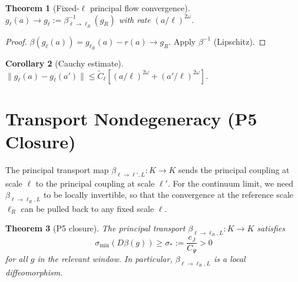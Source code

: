 \documentclass[12pt]{article}
\theoremstyle{plain}
\newtheorem{theorem}{Theorem}[section]
\newtheorem{corollary}[theorem]{Corollary}
\theoremstyle{definition}
\numberwithin{equation}{section}
\begin{document}
\begin{theorem}[Fixed-$\ell$ principal flow convergence]\label{thm:fixedellconv}
$g_\ell(a)\to g_\ell:=\beta_{\ell\to\ell_R}^{-1}(g_R)$ with rate $(a/\ell)^{2\omega}$.
\end{theorem}

\begin{proof}
$\beta(g_\ell(a))=g_{\ell_R}(a)-r(a)\to g_R$.  Apply $\beta^{-1}$ (Lipschitz).
\end{proof}

\begin{corollary}[Cauchy estimate]\label{cor:cauchy}
$\|g_\ell(a)-g_\ell(a')\|\leq\widetilde{C}_\ell[(a/\ell)^{2\omega}+(a'/\ell)^{2\omega}]$.
\end{corollary}


\section{Transport Nondegeneracy (P5 Closure)}\label{sec:P5}

The principal transport map $\beta_{\ell\to\ell',L}:K\to K$ sends the principal coupling at scale $\ell$ to the principal coupling at scale $\ell'$.  For the continuum limit, we need $\beta_{\ell\to\ell_R,L}$ to be locally invertible, so that the convergence at the reference scale $\ell_R$ can be pulled back to any fixed scale $\ell$.

\begin{theorem}[P5 closure]\label{thm:P5}
The principal transport $\beta_{\ell\to\ell_R,L}:K\to K$ satisfies
\begin{equation}
\sigma_{\min}(D\beta(g)) \geq \sigma_* := \frac{c_J}{C_\Psi} > 0
\end{equation}
for all $g$ in the relevant window.  In particular, $\beta_{\ell\to\ell_R,L}$ is a local diffeomorphism.
\end{theorem}
\end{document}
